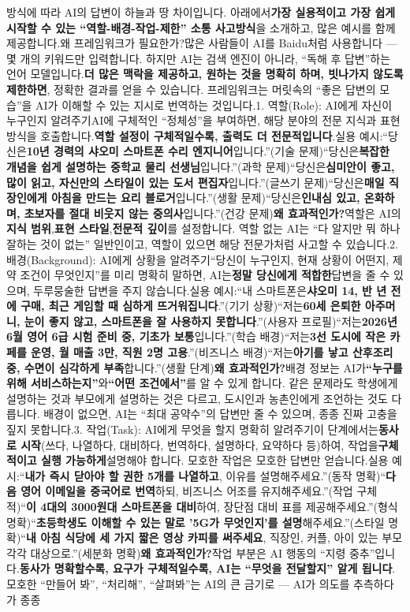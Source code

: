 방식에 따라 AI의 답변이 하늘과 땅 차이입니다. 아래에서\textbf{가장 실용적이고 가장 쉽게 시작할 수 있는 “역할-배경-작업-제한” 소통 사고방식}을 소개하고, 많은 예시를 함께 제공합니다.왜 프레임워크가 필요한가?많은 사람들이 AI를 Baidu처럼 사용합니다 — 몇 개의 키워드만 입력합니다. 하지만 AI는 검색 엔진이 아니라, “독해 후 답변”하는 언어 모델입니다.\textbf{더 많은 맥락을 제공하고, 원하는 것을 명확히 하며, 빗나가지 않도록 제한하면}, 정확한 결과를 얻을 수 있습니다. 프레임워크는 머릿속의 “좋은 답변의 모습”을 AI가 이해할 수 있는 지시로 번역하는 것입니다.1. 역할(Role): AI에게 자신이 누구인지 알려주기AI에 구체적인 “정체성”을 부여하면, 해당 분야의 전문 지식과 표현 방식을 호출합니다.\textbf{역할 설정이 구체적일수록, 출력도 더 전문적입니다}.실용 예시:“당신은\textbf{10년 경력의 샤오미 스마트폰 수리 엔지니어}입니다.”(기술 문제)“당신은\textbf{복잡한 개념을 쉽게 설명하는 중학교 물리 선생님}입니다.”(과학 문제)“당신은\textbf{심미안이 좋고, 많이 읽고, 자신만의 스타일이 있는 도서 편집자}입니다.”(글쓰기 문제)“당신은\textbf{매일 직장인에게 아침을 만드는 요리 블로거}입니다.”(생활 문제)“당신은\textbf{인내심 있고, 온화하며, 초보자를 절대 비웃지 않는 중의사}입니다.”(건강 문제)\textbf{왜 효과적인가?}역할은 AI의\textbf{지식 범위},\textbf{표현 스타일},\textbf{전문적 깊이}를 설정합니다. 역할 없는 AI는 “다 알지만 뭐 하나 잘하는 것이 없는” 일반인이고, 역할이 있으면 해당 전문가처럼 사고할 수 있습니다.2. 배경(Background): AI에게 상황을 알려주기“당신이 누구인지, 현재 상황이 어떤지, 제약 조건이 무엇인지”를 미리 명확히 말하면, AI는\textbf{정말 당신에게 적합한}답변을 줄 수 있으며, 두루뭉술한 답변을 주지 않습니다.실용 예시:“내 스마트폰은\textbf{샤오미 14, 반 년 전에 구매, 최근 게임할 때 심하게 뜨거워집니다}.”(기기 상황)“저는\textbf{60세 은퇴한 아주머니, 눈이 좋지 않고, 스마트폰을 잘 사용하지 못합니다}.”(사용자 프로필)“저는\textbf{2026년 6월 영어 6급 시험 준비 중, 기초가 보통}입니다.”(학습 배경)“저는\textbf{3선 도시에 작은 카페를 운영, 월 매출 3만, 직원 2명 고용}.”(비즈니스 배경)“저는\textbf{아기를 낳고 산후조리 중, 수면이 심각하게 부족}합니다.”(생활 단계)\textbf{왜 효과적인가?}배경 정보는 AI가\textbf{“누구를 위해 서비스하는지”}와\textbf{“어떤 조건에서”}를 알 수 있게 합니다. 같은 문제라도 학생에게 설명하는 것과 부모에게 설명하는 것은 다르고, 도시인과 농촌인에게 조언하는 것도 다릅니다. 배경이 없으면, AI는 “최대 공약수”의 답변만 줄 수 있으며, 종종 진짜 고충을 짚지 못합니다.3. 작업(Task): AI에게 무엇을 할지 명확히 알려주기이 단계에서는\textbf{동사로 시작}(쓰다, 나열하다, 대비하다, 번역하다, 설명하다, 요약하다 등)하여, 작업을\textbf{구체적이고 실행 가능하게}설명해야 합니다. 모호한 작업은 모호한 답변만 얻습니다.실용 예시:“\textbf{내가 즉시 닫아야 할 권한 5개를 나열하고}, 이유를 설명해주세요.”(동작 명확)“\textbf{다음 영어 이메일을 중국어로 번역}하되, 비즈니스 어조를 유지해주세요.”(작업 구체적)“\textbf{이 4대의 3000원대 스마트폰을 대비}하여, 장단점 대비 표를 제공해주세요.”(형식 명확)“\textbf{초등학생도 이해할 수 있는 말로 '5G가 무엇인지'를 설명}해주세요.”(스타일 명확)“\textbf{내 아침 식당에 세 가지 짧은 영상 카피를 써주세요}, 직장인, 커플, 아이 있는 부모 각각 대상으로.”(세분화 명확)\textbf{왜 효과적인가?}작업 부분은 AI 행동의 “지령 중추”입니다.\textbf{동사가 명확할수록, 요구가 구체적일수록, AI는 “무엇을 전달할지” 알게 됩니다}. 모호한 “만들어 봐”, “처리해”, “살펴봐”는 AI의 큰 금기로 — AI가 의도를 추측하다가 종종 